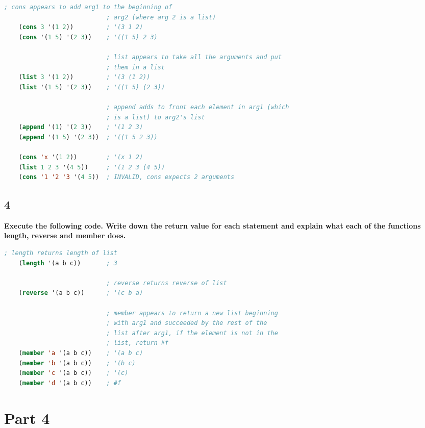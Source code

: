 \documentclass{article}
\begin{document}
\begin{lstlisting}[language=lisp,style=redStyle]
                            ; cons appears to add arg1 to the beginning of 
                            ; arg2 (where arg 2 is a list)
    (cons 3 '(1 2))         ; '(3 1 2)
    (cons '(1 5) '(2 3))    ; '((1 5) 2 3)
    
                            ; list appears to take all the arguments and put
                            ; them in a list
    (list 3 '(1 2))         ; '(3 (1 2))
    (list '(1 5) '(2 3))    ; '((1 5) (2 3))
    
                            ; append adds to front each element in arg1 (which
                            ; is a list) to arg2's list
    (append '(1) '(2 3))    ; '(1 2 3)
    (append '(1 5) '(2 3))  ; '((1 5 2 3))
    
    (cons 'x '(1 2))        ; '(x 1 2)
    (list 1 2 3 '(4 5))     ; '(1 2 3 (4 5))
    (cons '1 '2 '3 '(4 5))  ; INVALID, cons expects 2 arguments 
\end{lstlisting}

\subsection*{4}
\begin{adjustwidth}{2em}{0em}
    \textbf{Execute the following code. Write down the return value for each statement and explain what each of the functions length, reverse and member does. }
\end{adjustwidth}

\begin{lstlisting}[language=lisp,style=redStyle]
                            ; length returns length of list
    (length '(a b c))       ; 3
    
                            ; reverse returns reverse of list
    (reverse '(a b c))      ; '(c b a)
    
                            ; member appears to return a new list beginning 
                            ; with arg1 and succeeded by the rest of the
                            ; list after arg1, if the element is not in the
                            ; list, return #f
    (member 'a '(a b c))    ; '(a b c)
    (member 'b '(a b c))    ; '(b c)
    (member 'c '(a b c))    ; '(c)
    (member 'd '(a b c))    ; #f
\end{lstlisting}

\section*{Part 4}
\end{document}
